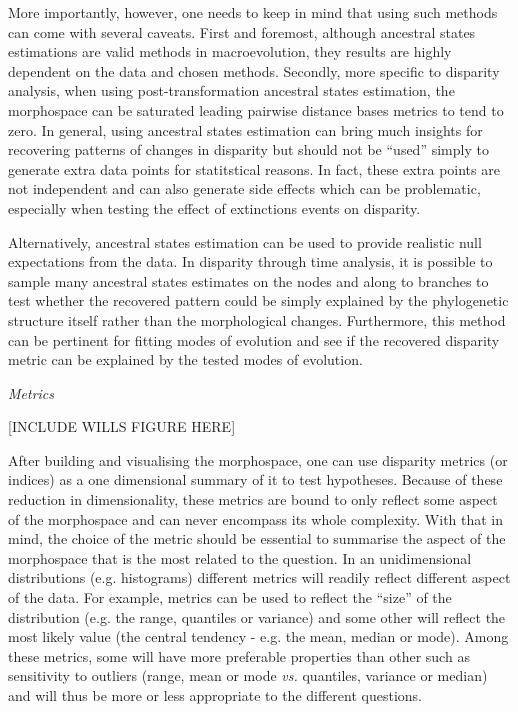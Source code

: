 \documentclass[12pt,letterpaper]{article}
\renewcommand{\subsection}[1]{%
\bigskip
\begin{center}
\begin{large}
\normalfont\itshape #1
\end{large}
\end{center}}
\begin{document}
More importantly, however, one needs to keep in mind that using such methods can come with several caveats.
First and foremost, although ancestral states estimations are valid methods in macroevolution, they results are highly dependent on the data and chosen methods.
Secondly, more specific to disparity analysis, when using post-transformation ancestral states estimation, the morphospace can be saturated leading pairwise distance bases metrics to tend to zero.
In general, using ancestral states estimation can bring much insights for recovering patterns of changes in disparity but should not be ``used'' simply to generate extra data points for statitstical reasons.
In fact, these extra points are not independent and can also generate side effects which can be problematic, especially when testing the effect of extinctions events on disparity.

Alternatively, ancestral states estimation can be used to provide realistic null expectations from the data.
In disparity through time analysis, it is possible to sample many ancestral states estimates on the nodes and along to branches to test whether the recovered pattern could be simply explained by the phylogenetic structure itself rather than the morphological changes.
Furthermore, this method can be pertinent for fitting modes of evolution and see if the recovered disparity metric can be explained by the tested modes of evolution.

\subsection{Metrics}
\label{metrics}
 
[INCLUDE WILLS FIGURE HERE]

After building and visualising the morphospace, one can use disparity metrics (or indices) as a one dimensional summary of it to test hypotheses.
Because of these reduction in dimensionality, these metrics are bound to only reflect some aspect of the morphospace and can never encompass its whole complexity.
With that in mind, the choice of the metric should be essential to summarise the aspect of the morphospace that is the most related to the question.
In an unidimensional distributions (e.g. histograms) different metrics will readily reflect different aspect of the data.
For example, metrics can be used to reflect the ``size'' of the distribution (e.g. the range, quantiles or variance) and some other will reflect the most likely value (the central tendency - e.g. the mean, median or mode).
Among these metrics, some will have more preferable properties than other such as sensitivity to outliers (range, mean or mode \textit{vs.} quantiles, variance or median) and will thus be more or less appropriate to the different questions.
\end{document}
